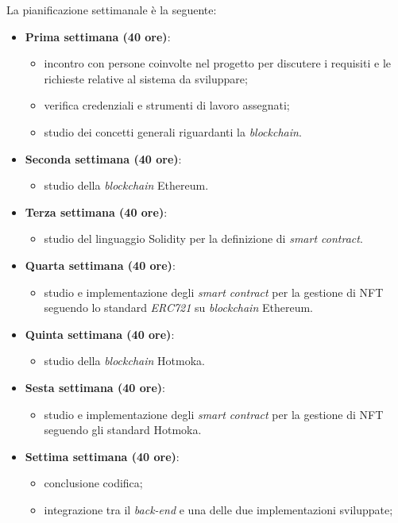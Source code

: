 \noindent La pianificazione settimanale è la seguente: 
\begin{itemize}
  \item \textbf{Prima settimana (40 ore)}:
  \begin{itemize}
      \item incontro con persone coinvolte nel progetto per discutere i requisiti e le richieste relative al sistema da sviluppare;
      \item verifica credenziali e strumenti di lavoro assegnati;
      \item studio dei concetti generali riguardanti la \textit{blockchain}.
  \end{itemize}
  \item \textbf{Seconda settimana (40 ore)}:
  \begin{itemize}
      \item studio della \textit{blockchain} Ethereum.
  \end{itemize}
  \item \textbf{Terza settimana (40 ore)}:
  \begin{itemize}
      \item studio del linguaggio Solidity per la definizione di \textit{smart contract}.
  \end{itemize}
  \item \textbf{Quarta settimana (40 ore)}:
  \begin{itemize}
      \item studio e implementazione degli \textit{smart contract} per la gestione di NFT seguendo lo standard \textit{ERC721} su \textit{blockchain} Ethereum.
  \end{itemize}
  \item \textbf{Quinta settimana (40 ore)}:
  \begin{itemize}
      \item studio della \textit{blockchain} Hotmoka.
  \end{itemize}
  \item \textbf{Sesta settimana (40 ore)}:
  \begin{itemize}
      \item studio e implementazione degli \textit{smart contract} per la gestione di NFT seguendo gli standard Hotmoka.
  \end{itemize}
  \item \textbf{Settima settimana (40 ore)}:
  \begin{itemize}
      \item conclusione codifica;
      \item integrazione tra il \textit{back-end} e una delle due implementazioni sviluppate;

\end{itemize}
\end{itemize}
